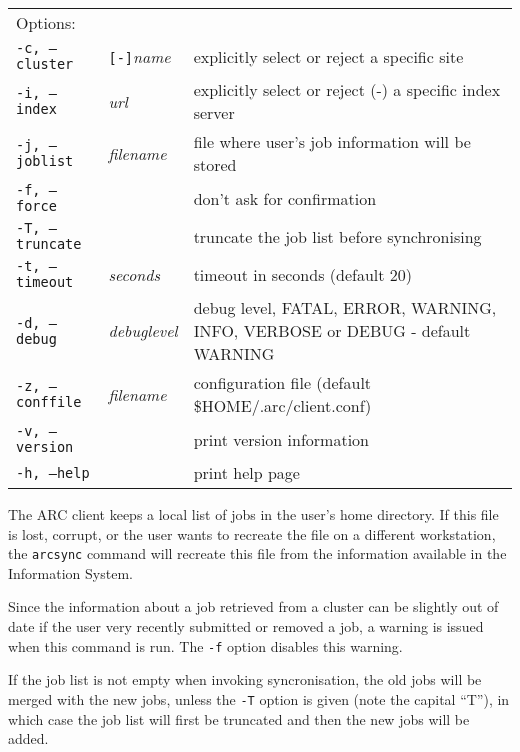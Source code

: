 \hspace*{0.5cm}
\begin{shaded}
\end{shaded}
\begin{longtable}{llp{8cm}}
   Options:&&\\
   \texttt{-c, --cluster}&\verb#[-]#\textit{name}&explicitly select or reject a specific site\\
   \texttt{-i, --index}&\textit{url}&explicitly select or reject (-) a specific index server\\
   \texttt{-j, --joblist}&\textit{filename}&file where user's job information will be stored\\
   \texttt{-f, --force}& &don't ask for confirmation\\
   \texttt{-T, --truncate}& &truncate the job list before synchronising\\
   \texttt{-t, --timeout}&\textit{seconds}&timeout in seconds (default 20)\\
   \texttt{-d, --debug}&\textit{debuglevel}&debug level, FATAL, ERROR, WARNING, INFO, VERBOSE or DEBUG - default WARNING\\
   \texttt{-z, --conffile}&\textit{filename}& configuration file (default {\$}HOME/.arc/client.conf)\\
   \texttt{-v, --version}&&print version information\\
   \texttt{-h, --help}&&print help page\\
\end{longtable}

The ARC client keeps a local list of jobs in the user's home
directory. If this file is lost,
corrupt, or the user wants to recreate the file on a different
workstation, the \texttt{arcsync} command will recreate this file from
the information available in the Information System.

Since  the  information  about  a job retrieved from a cluster can be slightly out of date if the user very recently
submitted or removed a job, a warning is issued when this command is run. The \verb#-f# option disables this warning.

If the job list is not empty when invoking syncronisation, the old jobs will be merged with the new jobs, unless
the \verb#-T# option is given (note the capital ``T''), in which case the job list will first be truncated and then the new jobs will be added.

